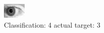 \begin{figure}[h!]
\begin{center}
\includegraphics[width=0.60\columnwidth]{figures/ID231_class_4_target_3.png}
\end{center}
\caption{ Classification: 4 actual target: 3}
\label{fig:ID231_class_4_target_3}
\end{figure}
